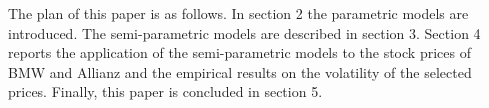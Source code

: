 The plan of this paper is as follows. In section 2 the parametric models are introduced. The semi-parametric models are described in section 3. Section 4 reports the application of the semi-parametric models to the stock prices of BMW and Allianz and the empirical results on the volatility of the selected prices. Finally, this paper is concluded in section 5.
